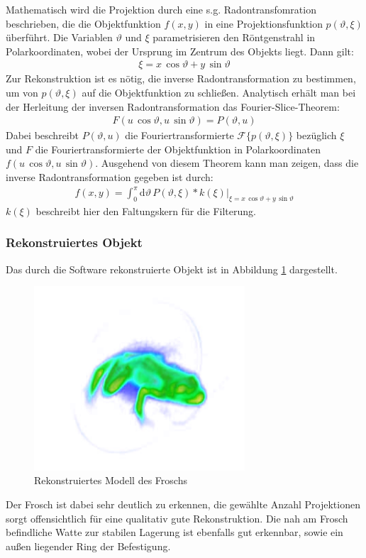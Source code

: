 \documentclass[11pt, a4paper]{article}
\numberwithin{equation}{section}
\begin{document}
Mathematisch wird die Projektion durch eine s.g. Radontransfomration beschrieben, die die Objektfunktion $f(x, y)$ in eine Projektionsfunktion $p(\vartheta, \xi)$ überführt.
Die Variablen $\vartheta$ und $\xi$ parametrisieren den Röntgenstrahl in Polarkoordinaten, wobei der Ursprung im Zentrum des Objekts liegt.
Dann gilt:
\begin{align}
\xi=x\,\cos\vartheta + y\,\sin\vartheta
\end{align}
Zur Rekonstruktion ist es nötig, die inverse Radontransformation zu bestimmen, um von $p(\vartheta, \xi)$ auf die Objektfunktion zu schließen.
Analytisch erhält man bei der Herleitung der inversen Radontransformation das Fourier-Slice-Theorem:
\begin{align}
F(u\,\cos\vartheta, u\,\sin\vartheta)=P(\vartheta, u)
\end{align}
Dabei beschreibt $P(\vartheta, u)$ die Fouriertransformierte $\mathcal{F}\{p(\vartheta, \xi)\}$ bezüglich $\xi$ und $F$ die Fouriertransformierte der Objektfunktion in Polarkoordinaten $f(u\,\cos\vartheta, u\,\sin\vartheta)$.
Ausgehend von diesem Theorem kann man zeigen, dass die inverse Radontransformation gegeben ist durch\cite{kalender}:
\begin{align}
f(x,y)=\int_{0}^{\pi}\left.\mathrm{d}\vartheta\,P(\vartheta, \xi)*k(\xi)\right|_{\xi=x\,\cos\vartheta + y\,\sin\vartheta}
\end{align}
$k(\xi)$ beschreibt hier den Faltungskern für die Filterung.

\subsubsection{Rekonstruiertes Objekt}
Das durch die Software rekonstruierte Objekt ist in Abbildung \ref{fig:ct_frosch} dargestellt.
\begin{figure}[ht]
	\centering
	\includegraphics[width=0.7\textwidth]{./figures/ct/frosch.jpg}
	\caption{Rekonstruiertes Modell des Froschs}
	\label{fig:ct_frosch}
\end{figure}
Der Frosch ist dabei sehr deutlich zu erkennen, die gewählte Anzahl Projektionen sorgt offensichtlich für eine qualitativ gute Rekonstruktion.
Die nah am Frosch befindliche Watte zur stabilen Lagerung ist ebenfalls gut erkennbar, sowie ein außen liegender Ring der Befestigung.
\end{document}
